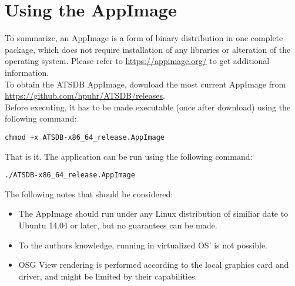 \section{Using the AppImage}

To summarize, an AppImage is a form of binary distribution in one complete package, which does not require installation of any libraries or alteration of the operating system. Please refer to \url{https://appimage.org/} to get additional information. \\

To obtain the ATSDB AppImage, download the most current AppImage from \url{https://github.com/hpuhr/ATSDB/releases}. \\

Before executing, it has to be made executable (once after download) using the following command:
\begin{lstlisting}
chmod +x ATSDB-x86_64_release.AppImage
\end{lstlisting}

That is it. The application can be run using the following command:
\begin{lstlisting}
./ATSDB-x86_64_release.AppImage
\end{lstlisting}

The following notes that should be considered:

\begin{itemize}  
\item The AppImage should run under any Linux distribution of similiar date to Ubuntu 14.04 or later, but no guarantees can be made.
\item To the authors knowledge, running in virtualized OS' is not possible.
\item OSG View rendering is performed according to the local graphics card and driver, and might be limited by their capabilities.
\end{itemize} 
